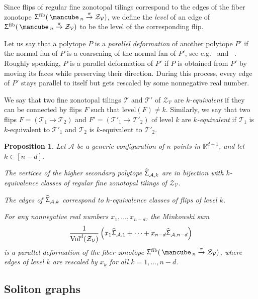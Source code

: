 \documentclass[11pt]{amsart}
\theoremstyle{plain}
\newtheorem{proposition}[theorem]{Proposition}
\theoremstyle{definition}
\def\R{\mathbb{R}}
\def\A{\mathcal{A}}
\def\V{\mathcal{V}}
\def\Zon{\mathcal{Z}}
\def\ZV{\Zon_\V}
\def\cube{\mbox{\,\mancube\,}}
\def\Vol{\mathrm{Vol}}
\def\level{\mathrm{level}}
\def\HSP{\widehat\Upsigma}
\def\Sigma{\HSP}
\def\fiber{{\operatorname{fib}}}
\def\FibPoly{\Upsigma^\fiber}
\def\pito{\overset \pi \to}
\def\Tcal{\mathcal{T}}
\def\Tiling{\Tcal}
\def\Vold{\Vol^d}
\begin{document}
Since flips of regular fine zonotopal tilings correspond to the edges of the fiber zonotope $\FibPoly(\cube_n\pito \ZV)$, we define the \emph{level} of an edge of $\FibPoly(\cube_n\pito \ZV)$ to be the level of the corresponding flip.

Let us say that a polytope $P$ is a \emph{parallel deformation} of another polytope $P'$ if the normal fan of $P$ is a coarsening of the normal fan of $P'$, see e.g.~\cite[Theorem 15.3]{PRW} and ~\cite[Section 2.2]{ACEP}. Roughly speaking, $P$ is a parallel deformation of $P'$ if $P$ is obtained from $P'$ by moving its faces while preserving their direction. During this process, every edge of $P'$ stays parallel to itself but gets rescaled by some nonnegative real number.

We say that two fine zonotopal tilings $\Tiling$ and $\Tiling'$ of $\ZV$ are \emph{$k$-equivalent} if they can be connected by flips $F$ such that $\level(F)\neq k$. Similarly, we say that two flips $F=(\Tiling_1\to\Tiling_2)$ and $F'=(\Tiling'_1\to\Tiling'_2)$ of level $k$ are \emph{$k$-equivalent} 
if $\Tiling_1$ is $k$-equivalent to $\Tiling'_1$ and $\Tiling_2$ is $k$-equivalent to $\Tiling'_2$.

\begin{proposition}\label{prop:deform}
Let $\A$ be a generic configuration of $n$ points in $\R^{d-1}$, and let $k\in[n-d]$.
\begin{theoremlist}
\item\label{item:deform_vert} The vertices of the higher secondary polytope $\Sigma_{\A,k}$ are in bijection with $k$-equivalence classes of regular fine zonotopal tilings of $\ZV$.
\item\label{item:deform_edge} The edges of $\Sigma_{\A,k}$ correspond to $k$-equivalence classes of flips of level $k$.
\item\label{item:deform_deform} For any nonnegative real numbers $x_1,\dots,x_{n-d}$, the Minkowski sum
  \[\frac1{\Vold(\ZV)} \left(x_1 \Sigma_{\A,1}+\dots + x_{n-d} \Sigma_{\A,n-d}\right)\]
is a parallel deformation of the fiber zonotope $\FibPoly(\cube_n\pito \ZV)$, where edges of level $k$ are rescaled by $x_k$ for all $k=1,\dots,n-d$.
\end{theoremlist}  
\end{proposition}



\subsection{Soliton graphs} 
\end{document}
